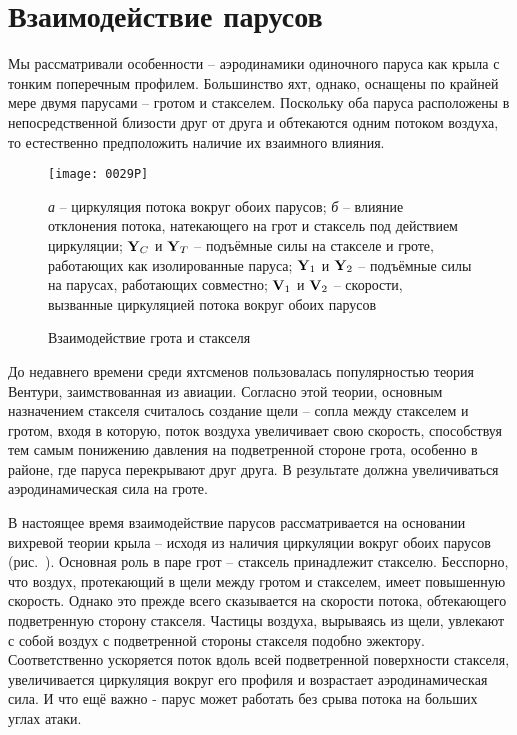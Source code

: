\section{Взаимодействие парусов}

Мы рассматривали особенности \--- аэродинамики одиночного паруса как
крыла с тонким поперечным профилем. Большинство яхт, однако, оснащены
по крайней мере двумя парусами \--- гротом и стакселем. Поскольку оба
паруса расположены в непосредственной близости друг от друга и
обтекаются одним потоком воздуха, то естественно предположить наличие
их взаимного влияния.

\begin{figure}[htb]
  \centering
  \texttt{[image: 0029P]}
  \caption{Взаимодействие грота и стакселя}
  \label{fig:29}
  \small
  \centering{}
  \textit{а} \--- циркуляция потока вокруг обоих парусов; \textit{б} \--- влияние отклонения потока, натекающего на грот и стаксель под действием циркуляции; $\mathbf{Y}_C$ и $\mathbf{Y}_T$ \--- подъёмные силы на стакселе и гроте, работающих как изолированные паруса; $\mathbf{Y}_1$ и $\mathbf{Y}_2$ \--- подъёмные силы на парусах, работающих совместно; $\mathbf{V}_1$ и $\mathbf{V}_2$ \--- скорости, вызванные циркуляцией потока вокруг обоих парусов
\end{figure}

До недавнего времени среди яхтсменов пользовалась популярностью теория
Вентури,
заимствованная из авиации. Согласно этой теории, основным
назначением стакселя считалось создание щели \--- сопла между
стакселем и гротом, входя в которую, поток воздуха увеличивает свою
скорость, способствуя тем самым понижению давления на подветренной
стороне грота, особенно в районе, где паруса перекрывают друг друга. В
результате должна увеличиваться аэродинамическая сила на гроте.

В настоящее время взаимодействие парусов рассматривается на основании
вихревой теории крыла \--- исходя из
наличия циркуляции вокруг обоих парусов (рис.~). Основная роль
в паре грот \--- стаксель принадлежит стакселю. Бесспорно, что воздух,
протекающий в щели между гротом и стакселем, имеет повышенную
скорость. Однако это прежде всего сказывается на скорости потока,
обтекающего подветренную сторону стакселя. Частицы воздуха, вырываясь
из щели, увлекают с собой воздух с подветренной стороны стакселя
подобно эжектору. Соответственно ускоряется поток вдоль всей
подветренной поверхности стакселя, увеличивается циркуляция вокруг его
профиля и возрастает аэродинамическая сила. И что ещё важно - парус
может работать без срыва потока на больших углах атаки.
 
